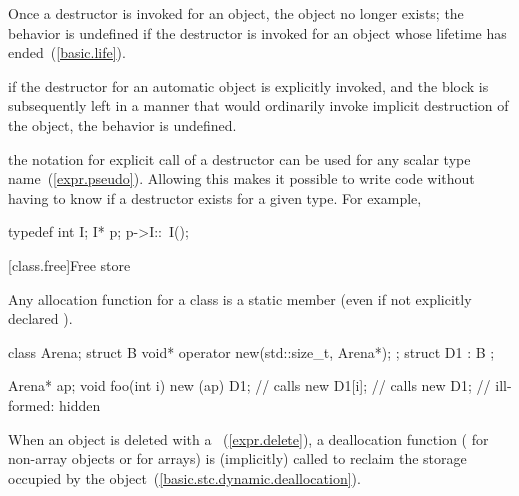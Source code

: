 \pnum
Once a destructor is invoked for an object, the object no longer exists;
the behavior is undefined if the destructor is invoked
for an object whose lifetime has ended~(\ref{basic.life}).
\begin{example}
if the destructor for an automatic object is explicitly invoked,
and the block is subsequently left in a manner that would ordinarily
invoke implicit destruction of the object, the behavior is undefined.
\end{example}

\pnum
\begin{note}
%
the notation for explicit call of a destructor can be used for any scalar type
name~(\ref{expr.pseudo}).
Allowing this makes it possible to write code without having to know if a
destructor exists for a given type.
For example,

\begin{codeblock}
typedef int I;
I* p;
p->I::~I();
\end{codeblock}
\end{note}

[class.free]{Free store}%
%

\pnum
{}
Any allocation function for a class
is a static member (even if not explicitly declared
).

\pnum
\begin{example}

\begin{codeblock}
class Arena;
struct B {
  void* operator new(std::size_t, Arena*);
};
struct D1 : B {
};

Arena*  ap;
void foo(int i) {
  new (ap) D1;      // calls 
  new D1[i];        // calls 
  new D1;           // ill-formed:  hidden
}
\end{codeblock}
\end{example}

\pnum
{}%
When an object is deleted with a
~(\ref{expr.delete}),
a deallocation function
%
(
%
for non-array objects or
%
for arrays) is (implicitly) called to reclaim the storage occupied by
the object~(\ref{basic.stc.dynamic.deallocation}).


